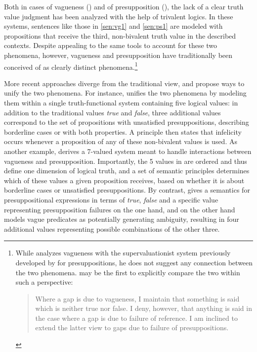 \documentclass[12pt, letterpaper]{article}
\begin{document}
{Both in cases of vagueness (\citealt{mehlberg1958,fine1975:vagueness,tye1995:sorites}) and of presupposition (\citealt{vanFraassen1966:reference,fox2012,george2008}), the lack of a clear truth value judgment has been analyzed with the help of trivalent logics. In these systems, sentences like those in \ref{sen:vg1} and \ref{sen:ps1} are modeled with propositions that receive the third, non-bivalent truth value in the described contexts. Despite appealing to the same tools to account for these two phenomena, however, vagueness and presupposition have traditionally been conceived of as clearly distinct phenomena.\footnote{\label{TyeFN}While \cite{fine1975:vagueness} analyzes vagueness with the supervaluationist system previously developed by \cite{vanFraassen1966:reference} for presuppositions, he does not suggest any connection between the two phenomena. \cite{tye1995:sorites} may be the first to explicitly compare the two within such a perspective: \begin{quotation}\noindent Where a gap is due to vagueness, I maintain that something is said which is neither true nor false. I deny, however, that anything is said in the case where a gap is due to failure of reference. I am inclined to extend the latter view to gaps due to failure of presuppositions.\end{quotation}}

More recent approaches diverge from the traditional view, and propose ways to unify the two phenomena. For instance, \cite{Zehr:2014} unifies the two phenomena by modeling them within a single truth-functional system containing five logical values: in addition to the traditional values \textit{true} and \textit{false}, three additional values correspond to the set of propositions with unsatisfied presuppositions, describing borderline cases or with both properties. A principle then states that infelicity occurs whenever a proposition of any of these non-bivalent values is used. As another example, \cite{spector2015:7valued} derives a 7-valued system meant to handle interactions between vagueness and presupposition. Importantly, the 5 values in \cite{Zehr:2014} are ordered and thus define one dimension of logical truth, and a set of semantic principles determines which of these values a given proposition receives, based on whether it is about borderline cases or unsatisfied presuppositions. By contrast, \cite{spector2015:7valued} gives a semantics for presuppositional expressions in terms of \textit{true}, \textit{false} and a specific value representing presupposition failures on the one hand, and on the other hand models vague predicates as potentially generating ambiguity, resulting in four additional values representing possible combinations of the other three.%

}
\end{document}
